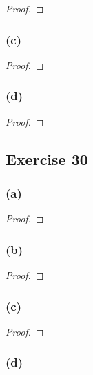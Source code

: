 \documentclass[14pt]{extarticle}
\begin{document}
\begin{proof}

\end{proof}

\subsubsection{(c)}

\begin{proof}

\end{proof}

\subsubsection{(d)}

\begin{proof}

\end{proof}

\subsection{Exercise 30}

\subsubsection{(a)}

\begin{proof}

\end{proof}

\subsubsection{(b)}

\begin{proof}

\end{proof}

\subsubsection{(c)}

\begin{proof}

\end{proof}

\subsubsection{(d)}
\end{document}

